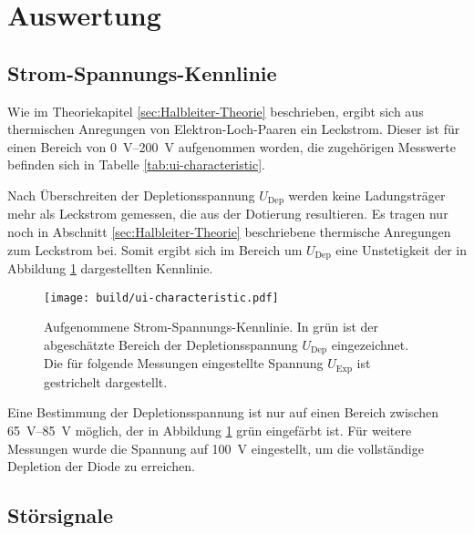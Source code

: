 \newpage
\section{Auswertung}
\label{sec:Auswertung}

\subsection{Strom-Spannungs-Kennlinie}
\label{sec:UI-Auswerung}

Wie im Theoriekapitel \ref{sec:Halbleiter-Theorie}
beschrieben, ergibt sich aus thermischen Anregungen von Elektron-Loch-Paaren
ein Leckstrom.
Dieser ist für einen Bereich von \SIrange{0}{200}{\volt} aufgenommen worden,
die zugehörigen Messwerte befinden sich in Tabelle \ref{tab:ui-characteristic}.

Nach Überschreiten der Depletionsspannung $U_\text{Dep}$ werden keine Ladungsträger mehr als
Leckstrom gemessen, die aus der Dotierung resultieren.
Es tragen nur noch in Abschnitt \ref{sec:Halbleiter-Theorie} beschriebene
thermische Anregungen zum Leckstrom bei.
Somit ergibt sich im Bereich um $U_\text{Dep}$ eine Unstetigkeit der in
Abbildung \ref{fig:ui-characteristic} dargestellten Kennlinie.
\begin{figure}
  \centering
  \texttt{[image: build/ui-characteristic.pdf]}  %
  \caption{Aufgenommene Strom-Spannungs-Kennlinie.
  In grün ist der abgeschätzte Bereich der Depletionsspannung $U_\text{Dep}$ eingezeichnet.
  Die für folgende Messungen eingestellte Spannung $U_\text{Exp}$ ist gestrichelt dargestellt.}
  \label{fig:ui-characteristic}
\end{figure}
Eine Bestimmung der Depletionsspannung ist nur auf einen Bereich zwischen
\SIrange[range-phrase={\text{ und }}]{65}{85}{\volt}
möglich, der in Abbildung \ref{fig:ui-characteristic} grün eingefärbt ist.
Für weitere Messungen wurde die Spannung auf \SI{100}{\volt} eingestellt, um
die vollständige Depletion der Diode zu erreichen.

\FloatBarrier
\subsection{Störsignale}
\label{sec:Stoersignale-Auswertung}

